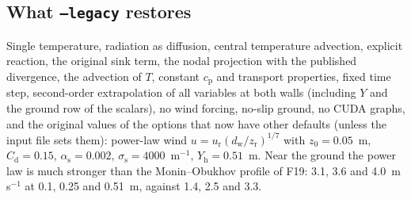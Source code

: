 \documentclass[11pt,a4paper]{article}
\newcommand{\code}[1]{\texttt{#1}}
\begin{document}
\subsection{What \code{--legacy} restores}
Single temperature, radiation as diffusion, central temperature advection, explicit reaction, the
original sink term, the nodal projection with the published divergence, the advection of $T$, constant $c_\text{p}$ and transport
properties, fixed time step, second-order extrapolation of all variables at both walls (including $Y$
and the ground row of the scalars), no wind forcing, no-slip ground, no CUDA graphs, and the original
values of the options that now have other defaults (unless the input file sets them): power-law wind
$u=u_\text{r}(d_\text{w}/z_\text{r})^{1/7}$ with $z_0=0.05$~m, $C_\text{d}=0.15$, $\alpha_\text{s}=0.002$, $\sigma_\text{s}=4000$~m$^{-1}$,
$Y_\text{h}=0.51$~m. Near the ground the power law is much stronger than the Monin--Obukhov profile of F19:
3.1, 3.6 and 4.0~m\,s$^{-1}$ at 0.1, 0.25 and 0.51~m, against 1.4, 2.5 and 3.3.
\end{document}
